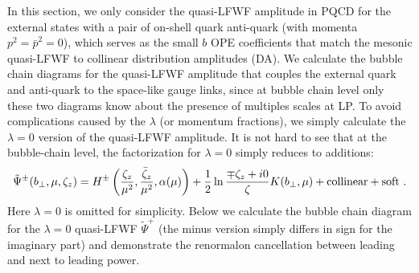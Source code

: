 \documentclass[a4paper,11pt]{article}
\begin{document}
In this section, we only consider the quasi-LFWF amplitude in PQCD for the external states with a pair of on-shell quark anti-quark (with momenta $p^2=\bar p^2=0$), which serves as the small $b$ OPE coefficients that match the mesonic quasi-LFWF to collinear distribution amplitudes (DA). We calculate the bubble chain diagrams for the quasi-LFWF amplitude that couples the external quark and anti-quark to the space-like gauge links, since at bubble chain level only these two diagrams know about the presence of multiples scales at LP. To avoid complications caused by the $\lambda$ (or momentum fractions), we simply calculate the $\lambda=0$ version of the quasi-LFWF amplitude. It is not hard to see that at the bubble-chain level, the factorization for $\lambda=0$ simply reduces to additions:
\begin{align}
\tilde \Psi^{\pm}(b_\perp,\mu,\zeta_z)=H^\pm\left(\frac{\zeta_z}{\mu^2},\frac{\bar \zeta_z}{\mu^2},\alpha(\mu)\right)+\frac{1}{2}\ln \frac{\mp \zeta_z+i0}{\zeta}K(b_\perp,\mu)+{\rm collinear+soft} \ .
\end{align}
Here $\lambda=0$ is omitted for simplicity. Below we calculate the bubble chain diagram for the $\lambda=0 $ quasi-LFWF $\tilde \Psi^+$ (the minus version simply differs in sign for the imaginary part) and demonstrate the renormalon cancellation between leading and next to leading power. 
\end{document}
